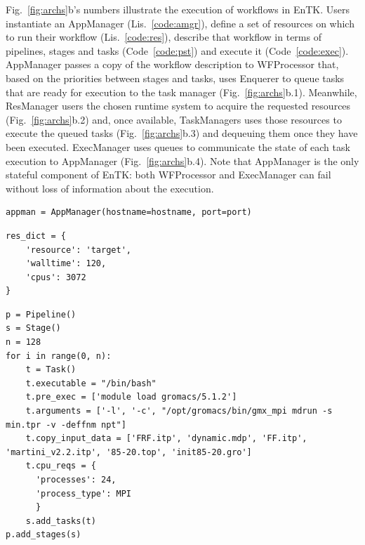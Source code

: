\documentclass[preprint,12pt, a4paper]{elsarticle}
\begin{document}
Fig.~\ref{fig:archs}b's numbers illustrate the execution of workflows in
EnTK\@. Users instantiate an AppManager (Lis.~\ref{code:amgr}), define a set
of resources on which to run their workflow (Lis.~\ref{code:res}), describe
that workflow in terms of pipelines, stages and tasks (Code~\ref{code:pst})
and execute it (Code~\ref{code:exec}). AppManager passes a copy of the
workflow description to WFProcessor that, based on the priorities between
stages and tasks, uses Enquerer to queue tasks that are ready for execution
to the task manager (Fig.~\ref{fig:archs}b.1). Meanwhile, ResManager users
the chosen runtime system to acquire the requested resources
(Fig.~\ref{fig:archs}b.2) and, once available, TaskManagers uses those
resources to execute the queued tasks (Fig.~\ref{fig:archs}b.3) and dequeuing
them once they have been executed. ExecManager uses queues to communicate the
state of each task execution to AppManager (Fig.~\ref{fig:archs}b.4). Note
that AppManager is the only stateful component of EnTK\@: both WFProcessor
and ExecManager can fail without loss of information about the execution.%

\begin{lstlisting}
appman = AppManager(hostname=hostname, port=port)
\end{lstlisting}

\begin{lstlisting}
res_dict = {
    'resource': 'target',
    'walltime': 120,
    'cpus': 3072
}
\end{lstlisting}

\begin{lstlisting}
p = Pipeline()
s = Stage()
n = 128
for i in range(0, n):
    t = Task()
    t.executable = "/bin/bash"
    t.pre_exec = ['module load gromacs/5.1.2']
    t.arguments = ['-l', '-c', "/opt/gromacs/bin/gmx_mpi mdrun -s min.tpr -v -deffnm npt"]
    t.copy_input_data = ['FRF.itp', 'dynamic.mdp', 'FF.itp', 'martini_v2.2.itp', '85-20.top', 'init85-20.gro'] 
    t.cpu_reqs = {
      'processes': 24,
      'process_type': MPI
      }
    s.add_tasks(t)
p.add_stages(s)
\end{lstlisting}
\end{document}
